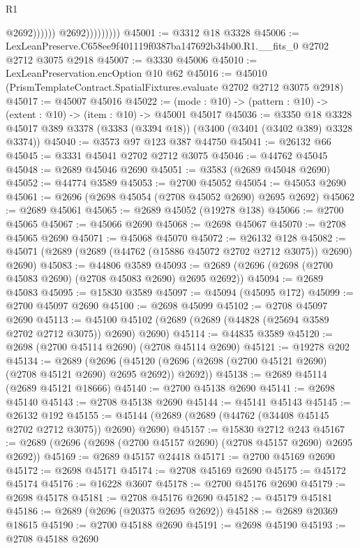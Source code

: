 \begin{lexlean}{R1}
\begin{coremodule}
                                  @2692))))))
                      @2692)))))))))
@45001 := @3312 @18 @3328
@45006 := LexLeanPreserve.C658ee9f401119f0387ba147692b34b00.R1.__fits_0 @2702 @2712 @3075 @2918
@45007 := @3330 @45006
@45010 := LexLeanPreservation.encOption @10 @62
@45016 := @45010 (PrismTemplateContract.SpatialFixtures.evaluate @2702 @2712 @3075 @2918)
@45017 := @45007 @45016
@45022 := (mode : @10) -> (pattern : @10) -> (extent : @10) -> (item : @10) -> @45001 @45017
@45036 := @3350
    @18
    @3328
    @45017
    @389
    @3378
    (@3383 (@3394 @18))
    (@3400 (@3401 (@3402 @389) @3328 @3374))
@45040 := @3573 @97 @123 @387 @44750
@45041 := @26132 @66
@45045 := @3331 @45041 @2702 @2712 @3075
@45046 := @44762 @45045
@45048 := @2689 @45046 @2690
@45051 := @3583 (@2689 @45048 @2690)
@45052 := @44774 @3589
@45053 := @2700 @45052
@45054 := @45053 @2690
@45061 := @2696 (@2698 @45054 (@2708 @45052 @2690) @2695 @2692)
@45062 := @2689 @45061
@45065 := @2689 @45052 (@19278 @138)
@45066 := @2700 @45065
@45067 := @45066 @2690
@45068 := @2698 @45067
@45070 := @2708 @45065 @2690
@45071 := @45068 @45070
@45072 := @26132 @128
@45082 := @45071 (@2689 (@2689 (@44762 (@15886 @45072 @2702 @2712 @3075)) @2690) @2690)
@45083 := @44806 @3589
@45093 := @2689 (@2696 (@2698 (@2700 @45083 @2690) (@2708 @45083 @2690) @2695 @2692))
@45094 := @2689 @45083
@45095 := @15830 @3589
@45097 := @45094 (@45095 @172)
@45099 := @2700 @45097 @2690
@45100 := @2698 @45099
@45102 := @2708 @45097 @2690
@45113 := @45100 @45102 (@2689 (@2689 (@44828 (@25694 @3589 @2702 @2712 @3075)) @2690) @2690)
@45114 := @44835 @3589
@45120 := @2698 (@2700 @45114 @2690) (@2708 @45114 @2690)
@45121 := @19278 @202
@45134 := @2689
    (@2696 (@45120 (@2696 (@2698 (@2700 @45121 @2690) (@2708 @45121 @2690) @2695 @2692)) @2692))
@45138 := @2689 @45114 (@2689 @45121 @18666)
@45140 := @2700 @45138 @2690
@45141 := @2698 @45140
@45143 := @2708 @45138 @2690
@45144 := @45141 @45143
@45145 := @26132 @192
@45155 := @45144 (@2689 (@2689 (@44762 (@34408 @45145 @2702 @2712 @3075)) @2690) @2690)
@45157 := @15830 @2712 @243
@45167 := @2689 (@2696 (@2698 (@2700 @45157 @2690) (@2708 @45157 @2690) @2695 @2692))
@45169 := @2689 @45157 @24418
@45171 := @2700 @45169 @2690
@45172 := @2698 @45171
@45174 := @2708 @45169 @2690
@45175 := @45172 @45174
@45176 := @16228 @3607
@45178 := @2700 @45176 @2690
@45179 := @2698 @45178
@45181 := @2708 @45176 @2690
@45182 := @45179 @45181
@45186 := @2689 (@2696 (@20375 @2695 @2692))
@45188 := @2689 @20369 @18615
@45190 := @2700 @45188 @2690
@45191 := @2698 @45190
@45193 := @2708 @45188 @2690

\end{coremodule}
\end{lexlean}

